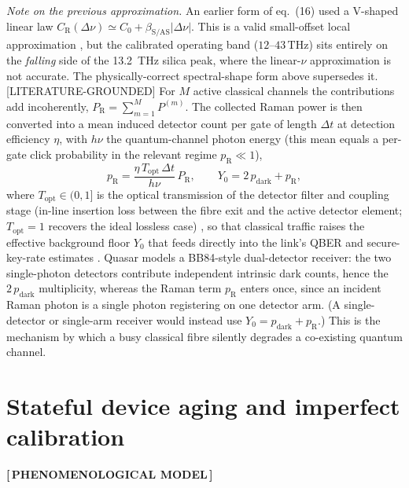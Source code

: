 \documentclass[11pt]{article}
\newcommand{\statusPhenom}{\textbf{\color{phenom}[\,PHENOMENOLOGICAL MODEL\,]}}
\begin{document}
\textit{Note on the previous approximation.} An earlier form of eq.~(16) used a V-shaped
linear law $C_{\mathrm{R}}(\Delta\nu)\simeq C_0+\beta_{\mathrm{S/AS}}|\Delta\nu|$.  This is
a valid small-offset local approximation \cite{dasilva2014}, but the calibrated operating band
($12$--$43\,\mathrm{THz}$) sits entirely on the \emph{falling} side of the 13.2~THz silica
peak, where the linear-$\nu$ approximation is not accurate.  The physically-correct
spectral-shape form above supersedes it.  [LITERATURE-GROUNDED]
For $M$ active classical channels the contributions add incoherently,
$P_{\mathrm{R}}=\sum_{m=1}^{M}P^{(m)}$. The collected Raman power is then converted into a mean
induced detector count per gate of length $\Delta t$ at detection efficiency $\eta$, with
$h\nu$ the quantum-channel photon energy (this mean equals a per-gate click probability in the
relevant regime $p_{\mathrm{R}}\ll 1$),
\begin{equation}
\boxed{\;p_{\mathrm{R}}=\frac{\eta\,T_{\mathrm{opt}}\,\Delta t}{h\nu}\,P_{\mathrm{R}},\qquad
Y_0 = 2\,p_{\mathrm{dark}}+p_{\mathrm{R}},\;}
\end{equation}
where $T_{\mathrm{opt}}\in(0,1]$ is the optical transmission of the detector filter and coupling
stage (in-line insertion loss between the fibre exit and the active detector element;
$T_{\mathrm{opt}}=1$ recovers the ideal lossless case) \cite{eraerds2010,dasilva2014},
so that classical traffic raises the effective background floor $Y_0$ that feeds directly into
the link's QBER and secure-key-rate estimates \cite{eraerds2010}. Quasar models a
BB84-style dual-detector receiver: the two single-photon detectors contribute independent
intrinsic dark counts, hence the $2\,p_{\mathrm{dark}}$ multiplicity, whereas the Raman term
$p_{\mathrm{R}}$ enters once, since an incident Raman photon is a single photon registering on
one detector arm. (A single-detector or single-arm receiver would instead use
$Y_0=p_{\mathrm{dark}}+p_{\mathrm{R}}$.) This is the mechanism by which a busy classical fibre
silently degrades a co-existing quantum channel.

\section{Stateful device aging and imperfect calibration}
\statusPhenom
\end{document}
